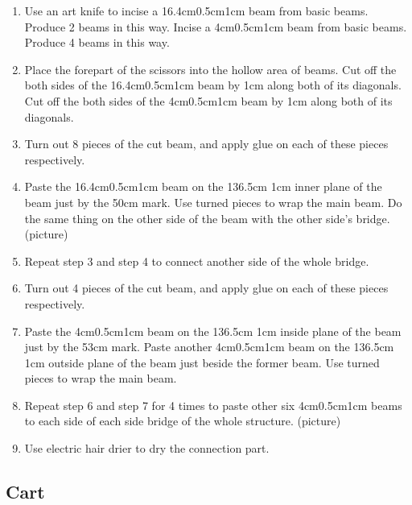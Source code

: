 \begin{enumerate}
	\begin{enumerate}
	\item Use an art knife to incise a 16.4cm0.5cm1cm beam from basic beams. Produce 2 beams in this way. Incise a 4cm0.5cm1cm beam from basic beams. Produce 4 beams in this way.
	\item Place the forepart of the scissors into the hollow area of beams. Cut off the both sides of the 16.4cm0.5cm1cm beam by 1cm along both of its diagonals. Cut off the both sides of the 4cm0.5cm1cm beam by 1cm along both of its diagonals.
	\item Turn out 8 pieces of the cut beam, and apply glue on each of these pieces respectively. 
	\item Paste the 16.4cm0.5cm1cm beam on the 136.5cm 1cm inner plane of the beam just by the 50cm mark. Use turned pieces to wrap the main beam. Do the same thing on the other side of the beam with the other side’s bridge.
	(picture) 
	\item Repeat step 3 and step 4 to connect another side of the whole bridge.
	\item Turn out 4 pieces of the cut beam, and apply glue on each of these pieces respectively. 
	\item Paste the 4cm0.5cm1cm beam on the 136.5cm 1cm inside plane of the beam just by the 53cm mark. Paste another 4cm0.5cm1cm beam on the 136.5cm 1cm outside plane of the beam just beside the former beam. Use turned pieces to wrap the main beam. 
	\item Repeat step 6 and step 7 for 4 times to paste other six 4cm0.5cm1cm beams to each side of each side bridge of the whole structure. 
	(picture)
	\item Use electric hair drier to dry the connection part. 
	\end{enumerate}
\end{enumerate}




\subsection{Cart}